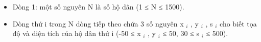 \begin{itemize}
	\item     Dòng 1: một số nguyên N là số hộ dân (1 ≤ N ≤ 1500).   
	\item     Dòng thứ i trong N dòng tiếp theo chứa 3 số nguyên x    $_     i    $    , y    $_     i    $    , s    $_     i    $    cho biết tọa độ và diện tích của hộ dân thứ i (-50 ≤ x    $_     i    $    , y    $_     i    $    ≤ 50, 30 ≤ s    $_     i    $    ≤ 500).   
\end{itemize}
